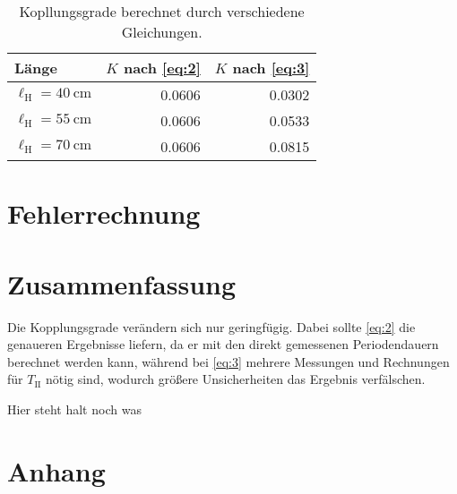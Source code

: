 \documentclass[12pt,a4paper]{scrartcl}
\newcommand{\lh}{\ell_{\mathrm{H}}}
\begin{document}
\begin{table}[H]
	\begin{tabular*}{\textwidth}{@{\extracolsep{\fill}}@{\hspace{5pt}}lrr@{\hspace{5pt}}}
		\toprule
		Länge & \(K\) nach \autoref{eq:2} & \(K\) nach \autoref{eq:3}\\
		\midrule
		\(\lh = \qty{40}{\centi\meter}\) & \num{0,0606} & \num{0,0302}\\
		\(\lh = \qty{55}{\centi\meter}\) & \num{0,0606} & \num{0,0533}\\
		\(\lh = \qty{70}{\centi\meter}\) & \num{0,0606} & \num{0,0815}\\
		\bottomrule
	\end{tabular*}
	\caption{Kopllungsgrade berechnet durch verschiedene Gleichungen. \label{tbl:kopplungsgrade}}
\end{table}

\section{Fehlerrechnung}



\section{Zusammenfassung}
Die Kopplungsgrade verändern sich nur geringfügig. Dabei sollte \autoref{eq:2} die genaueren Ergebnisse liefern, da er mit den direkt gemessenen Periodendauern berechnet werden kann, während bei \autoref{eq:3} mehrere Messungen und Rechnungen für \(T_{\text{II}}\) nötig sind, wodurch größere Unsicherheiten das Ergebnis verfälschen.

Hier steht halt noch was \cite{mbuch}

\printbibliography
\section{Anhang}

%
\end{document}
